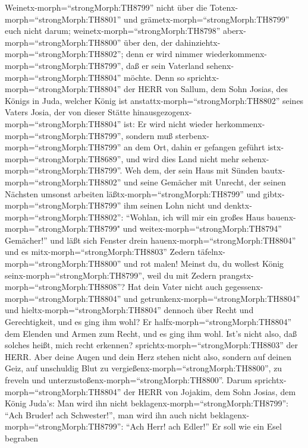 Weinetx-morph=``strongMorph:TH8799'' nicht über die
Totenx-morph=``strongMorph:TH8801'' und
grämetx-morph=``strongMorph:TH8799'' euch nicht darum;
weinetx-morph=``strongMorph:TH8798'' aberx-morph=``strongMorph:TH8800''
über den, der dahinziehtx-morph=``strongMorph:TH8802''; denn er wird
nimmer wiederkommenx-morph=``strongMorph:TH8799'', daß er sein Vaterland
sehenx-morph=``strongMorph:TH8804'' möchte.  Denn so
sprichtx-morph=``strongMorph:TH8804'' der HERR von Sallum, dem Sohn
Josias, des Königs in Juda, welcher König ist
anstattx-morph=``strongMorph:TH8802'' seines Vaters Josia, der von
dieser Stätte hinausgezogenx-morph=``strongMorph:TH8804'' ist: Er wird
nicht wieder herkommenx-morph=``strongMorph:TH8799'', 
sondern muß sterbenx-morph=``strongMorph:TH8799'' an dem Ort, dahin er
gefangen geführt istx-morph=``strongMorph:TH8689'', und wird dies Land
nicht mehr sehenx-morph=``strongMorph:TH8799''.  Weh dem,
der sein Haus mit Sünden bautx-morph=``strongMorph:TH8802'' und seine
Gemächer mit Unrecht, der seinen Nächsten umsonst arbeiten
läßtx-morph=``strongMorph:TH8799'' und
gibtx-morph=``strongMorph:TH8799'' ihm seinen Lohn nicht 
und denktx-morph=``strongMorph:TH8802'': ``Wohlan, ich will mir ein
großes Haus bauenx-morph=''strongMorph:TH8799" und
weitex-morph=``strongMorph:TH8794'' Gemächer!'' und läßt sich Fenster
drein hauenx-morph=``strongMorph:TH8804'' und es
mitx-morph=``strongMorph:TH8803'' Zedern
täfelnx-morph=``strongMorph:TH8800'' und rot malen!  Meinst
du, du wollest König seinx-morph=``strongMorph:TH8799'', weil du mit
Zedern prangstx-morph=``strongMorph:TH8808''? Hat dein Vater nicht auch
gegessenx-morph=``strongMorph:TH8804'' und
getrunkenx-morph=``strongMorph:TH8804'' und
hieltx-morph=``strongMorph:TH8804'' dennoch über Recht und
Gerechtigkeit, und es ging ihm wohl?  Er
halfx-morph=``strongMorph:TH8804'' dem Elenden und Armen zum Recht, und
es ging ihm wohl. Ist's nicht also, daß solches heißt, mich recht
erkennen? sprichtx-morph=``strongMorph:TH8803'' der HERR. 
Aber deine Augen und dein Herz stehen nicht also, sondern auf deinen
Geiz, auf unschuldig Blut zu vergießenx-morph=``strongMorph:TH8800'', zu
freveln und unterzustoßenx-morph=``strongMorph:TH8800''. 
Darum sprichtx-morph=``strongMorph:TH8804'' der HERR von Jojakim, dem
Sohn Josias, dem König Juda's: Man wird ihn nicht
beklagenx-morph=``strongMorph:TH8799'': ``Ach Bruder! ach Schwester!'',
man wird ihn auch nicht beklagenx-morph=``strongMorph:TH8799'': ``Ach
Herr! ach Edler!''  Er soll wie ein Esel begraben
